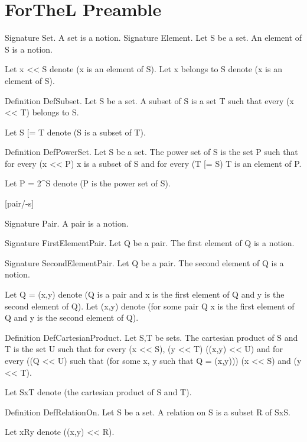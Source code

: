 \section*{ForTheL Preamble}

\begin{forthelfull}
[set/-s] [element/-s] [belong/-s]

Signature Set. A set is a notion.
Signature Element. 
    Let S be a set.
    An element of S is a notion.

Let x << S denote (x is an element of S).
Let x belongs to S denote (x is an element of S).

Definition DefSubset. 
    Let S be a set.
    A subset of S is a set T such that every (x << T) belongs to S.

Let S [= T denote (S is a subset of T).

Definition DefPowerSet. 
    Let S be a set.
    The power set of S is the set P such that
    for every (x << P) x is a subset of S
    and for every (T [= S) T is an element of P.

Let P = 2^S denote (P is the power set of S).

[pair/-s]

Signature Pair. A pair is a notion.

Signature FirstElementPair.
    Let Q be a pair.
    The first element of Q is a notion.

Signature SecondElementPair.
    Let Q be a pair.
    The second element of Q is a notion.

Let Q = (x,y) denote (Q is a pair and x is the first element of Q and y is the second element of Q).
Let (x,y) denote (for some pair Q x is the first element of Q and y is the second element of Q).

Definition DefCartesianProduct. 
    Let S,T be sets.
    The cartesian product of S and T is the set U such that
    for every (x << S), (y << T) ((x,y) << U)
    and for every ((Q << U) such that (for some x, y such that Q = (x,y)))
    (x << S) and (y << T).

Let SxT denote (the cartesian product of S and T).

Definition DefRelationOn. 
    Let S be a set.
    A relation on S is a subset R of SxS.

Let xRy denote ((x,y) << R).
\end{forthelfull}
